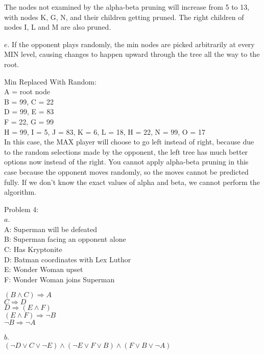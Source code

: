 \documentclass[11pt, oneside]{article}   	%
\begin{document}
\begin{flushleft}
The nodes not examined by the alpha-beta pruning will increase from 5 to 13, with nodes K, G, N, and their children getting pruned. The right children of nodes I, L and M are also pruned.\\\medskip

$e$. If the opponent plays randomly, the min nodes are picked arbitrarily at every MIN level, causing changes to happen upward through the tree all the way to the root. \\\medskip

Min Replaced With Random:\\
A = root node\\
B = 99, C = 22\\
D = 99, E = 83 \\
F = 22, G = 99 \\
H = 99, I = 5, J = 83, K = 6, L = 18, H = 22, N = 99, O = 17 \\\medskip
In this case, the MAX player will choose to go left instead of right, because due to the random selections made by the opponent, the left tree has much better options now instead of the right. You cannot apply alpha-beta pruning in this case because the opponent moves randomly, so the moves cannot be predicted fully. If we don't know the exact values of alpha and beta, we cannot perform the algorithm.\\\medskip

Problem 4: \\
$a$.\\
A: Superman will be defeated \\
B: Superman facing an opponent alone \\
C: Has Kryptonite \\
D: Batman coordinates with Lex Luthor \\
E: Wonder Woman upset \\
F: Wonder Woman joins Superman \\\medskip

$(B \wedge C) \Rightarrow A$ \\
$C \Rightarrow D$ \\
$D \Rightarrow (E \wedge F)$ \\
$(E \wedge F) \Rightarrow \neg B$ \\
$\neg B \Rightarrow \neg A$ \\\medskip

$b$. \\
$(\neg D \vee C \vee \neg E ) \wedge (\neg E \vee F \vee B ) \wedge (F \vee B \vee \neg A)$ \\\medskip


\end{flushleft}
\end{document}
